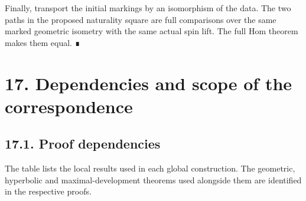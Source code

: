 \documentclass[
  english,
  11pt,
  reqno]{amsart}
\begin{document}
Finally, transport the initial markings by an isomorphism of the data.
The two paths in the proposed naturality square are full comparisons
over the same marked geometric isometry with the same actual spin lift.
The full Hom theorem makes them equal. ∎

\protect{}\label{sec:dependencies-and-scope}

\section{17. Dependencies and scope of the
correspondence}\label{dependencies-and-scope-of-the-correspondence}

\protect{}\label{sec:proof-dependencies}

\subsection{17.1. Proof dependencies}\label{proof-dependencies}

The table lists the local results used in each global construction. The
geometric, hyperbolic and maximal-development theorems used alongside
them are identified in the respective proofs.
\end{document}
